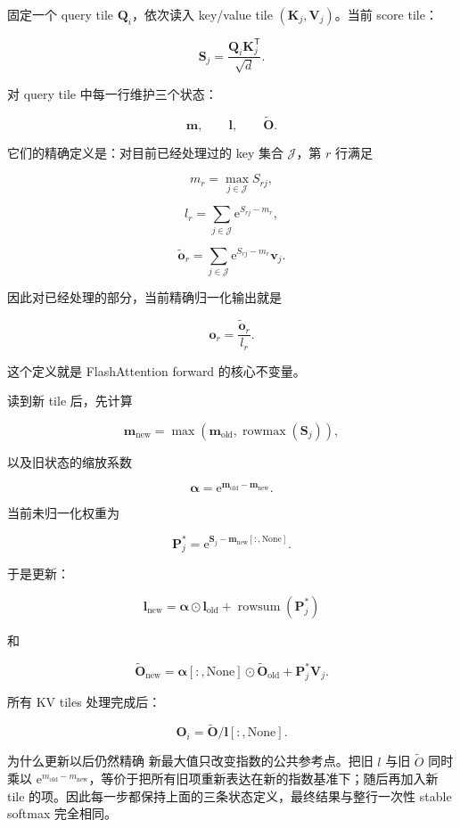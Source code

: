 \documentclass[profile=standard,twoside=false]{ipara-handbook}
\begin{document}
固定一个 query tile $\boldsymbol{Q}_i$，依次读入 key/value tile $(\boldsymbol{K}_j,\boldsymbol{V}_j)$。当前 score tile：

$$
\boldsymbol{S}_j
=\frac{\boldsymbol{Q}_i\boldsymbol{K}_j^{\mathsf T}}{\sqrt d}.
$$

对 query tile 中每一行维护三个状态：

$$
\boldsymbol{m},\qquad
\boldsymbol{l},\qquad
\widetilde{\boldsymbol{O}}.
$$

它们的精确定义是：对目前已经处理过的 key 集合 $\mathcal{J}$，第 $r$ 行满足

$$
m_r
=\max_{j\in\mathcal{J}}S_{rj},
$$

$$
l_r
=\sum_{j\in\mathcal{J}}\mathrm{e}^{S_{rj}-m_r},
$$

$$
\widetilde{\boldsymbol{o}}_r
=\sum_{j\in\mathcal{J}}
\mathrm{e}^{S_{rj}-m_r}\boldsymbol{v}_j.
$$

因此对已经处理的部分，当前精确归一化输出就是

$$
\boldsymbol{o}_r
=\frac{\widetilde{\boldsymbol{o}}_r}{l_r}.
$$

这个定义就是 FlashAttention forward 的核心不变量。

读到新 tile 后，先计算

$$
\boldsymbol{m}_{\text{new}}
=\max\left(
\boldsymbol{m}_{\text{old}},
\operatorname{rowmax}(\boldsymbol{S}_j)
\right),
$$

以及旧状态的缩放系数

$$
\boldsymbol{\alpha}
=\mathrm{e}^{\boldsymbol{m}_{\text{old}}-\boldsymbol{m}_{\text{new}}}.
$$

当前未归一化权重为

$$
\boldsymbol{P}_j^{*}
=\mathrm{e}^{
\boldsymbol{S}_j-
\boldsymbol{m}_{\text{new}}[:,\mathrm{None}]
}.
$$

于是更新：

$$
\boxed{
\boldsymbol{l}_{\text{new}}
=\boldsymbol{\alpha}\odot\boldsymbol{l}_{\text{old}}
+\operatorname{rowsum}(\boldsymbol{P}_j^{*})
}
$$

和

$$
\boxed{
\widetilde{\boldsymbol{O}}_{\text{new}}
=\boldsymbol{\alpha}[:,\mathrm{None}]\odot
\widetilde{\boldsymbol{O}}_{\text{old}}
+\boldsymbol{P}_j^{*}\boldsymbol{V}_j
}.
$$

所有 KV tiles 处理完成后：

$$
\boxed{
\boldsymbol{O}_i
=\widetilde{\boldsymbol{O}}/\boldsymbol{l}[:,\mathrm{None}]
}.
$$

\begin{criterion}{为什么更新以后仍然精确}
新最大值只改变指数的公共参考点。把旧 $l$ 与旧 $\widetilde O$ 同时乘以 $\mathrm{e}^{m_{\text{old}}-m_{\text{new}}}$，等价于把所有旧项重新表达在新的指数基准下；随后再加入新 tile 的项。因此每一步都保持上面的三条状态定义，最终结果与整行一次性 stable softmax 完全相同。
\end{criterion}
\end{document}

